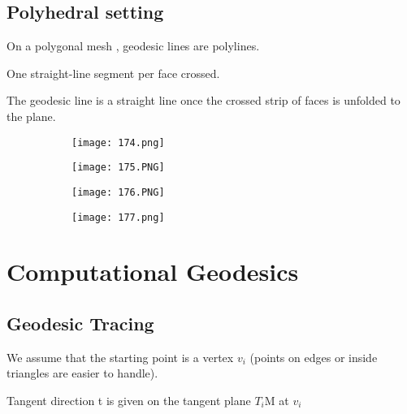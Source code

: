 \documentclass{article}
\begin{document}
\subsection{Polyhedral setting}

On a polygonal mesh , geodesic lines are polylines.

One straight-line segment per face crossed.

The geodesic line is a straight line once the crossed strip of faces is unfolded to the plane.

   \begin{figure}[ht!]
  \centering
  \begin{subfigure}[b]{0.7\linewidth}
    \texttt{[image: 174.png]}
  \end{subfigure}
\end{figure}


\begin{figure}[ht!]
  \centering
  \begin{subfigure}[b]{0.49\linewidth}
    \texttt{[image: 175.PNG]}
  \end{subfigure}
     \begin{subfigure}[b]{0.49\textwidth}
         \centering
         \texttt{[image: 176.PNG]}
     \end{subfigure}
\end{figure}

   \begin{figure}[ht!]
  \centering
  \begin{subfigure}[b]{0.8\linewidth}
    \texttt{[image: 177.png]}
  \end{subfigure}
\end{figure}

\vspace{20mm}


\section{Computational Geodesics}

\subsection{Geodesic Tracing}

We assume that the starting point is a vertex $v_i$ (points on edges or inside triangles are easier to handle).

Tangent direction t is given on the tangent plane $T_i$M at $v_i$
\end{document}
